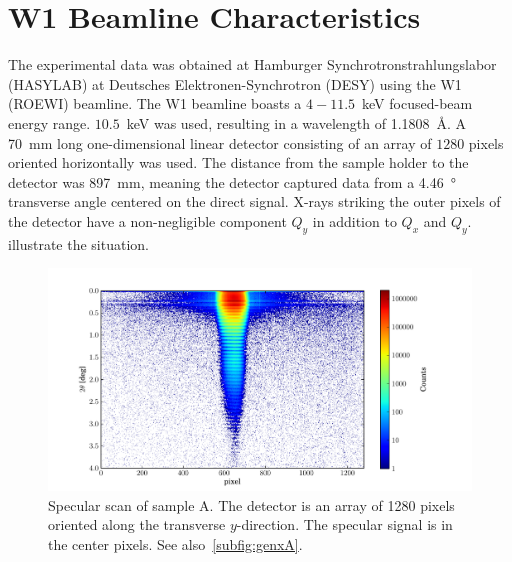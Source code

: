 \documentclass[10pt,twoside, b5paper,pdftex]{report}
\begin{document}
\section{W1 Beamline Characteristics\label{sec:W1}}
The experimental data was obtained at Hamburger Synchrotronstrahlungslabor (HASYLAB) at Deutsches Elektronen-Synchrotron (DESY) using the W1 (ROEWI) beamline. The W1 beamline boasts a  $4 - 11.5$~\si{\kilo\electronvolt} focused-beam energy range. $10.5$~\si{\kilo\electronvolt} was used, resulting in a wavelength of 1.1808~\si{\angstrom}. A \SI{70}{\milli\meter} long one-dimensional linear detector consisting of an array of $1280$ pixels   oriented horizontally was used. The distance from the sample holder to the detector was \SI{897}{\milli\meter}, meaning the detector captured data from a \SI{4.46}{\degree} transverse angle centered on the direct signal. X-rays striking the outer pixels of the detector have a non-negligible component $Q_y$ in addition to $Q_x$ and $Q_y$.  illustrate the situation. 
\begin{figure}[htbp]
	\begin{center}
		\includegraphics[width=1.2\textwidth]{figures/matrix_just_00316.pdf}
	\end{center}
	\caption{Specular scan of sample A. The detector is an array of 1280 pixels oriented along the transverse $y$-direction. The specular signal is in the center pixels. See also~\cref{subfig:genxA}.\label{fig:matrix_just_00316}}
\end{figure}
\end{document}
